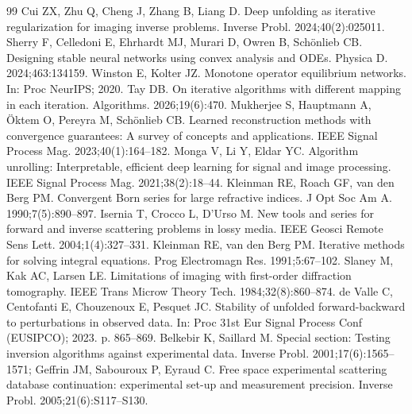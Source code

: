 \documentclass[journal,cmes,article,submit,moreauthors,pdftex]{Definitions/tsp}
\begin{document}
\begin{thebibliography}{99}
Cui ZX, Zhu Q, Cheng J, Zhang B, Liang D. Deep unfolding as iterative regularization for imaging inverse problems. Inverse Probl. 2024;40(2):025011.
Sherry F, Celledoni E, Ehrhardt MJ, Murari D, Owren B, Sch\"onlieb CB. Designing stable neural networks using convex analysis and ODEs. Physica D. 2024;463:134159.
Winston E, Kolter JZ. Monotone operator equilibrium networks. In: Proc NeurIPS; 2020.
Tay DB. On iterative algorithms with different mapping in each iteration. Algorithms. 2026;19(6):470.
Mukherjee S, Hauptmann A, \"Oktem O, Pereyra M, Sch\"onlieb CB. Learned reconstruction methods with convergence guarantees: A survey of concepts and applications. IEEE Signal Process Mag. 2023;40(1):164--182.
Monga V, Li Y, Eldar YC. Algorithm unrolling: Interpretable, efficient deep learning for signal and image processing. IEEE Signal Process Mag. 2021;38(2):18--44.
Kleinman RE, Roach GF, van den Berg PM. Convergent Born series for large refractive indices. J Opt Soc Am A. 1990;7(5):890--897.
Isernia T, Crocco L, D'Urso M. New tools and series for forward and inverse scattering problems in lossy media. IEEE Geosci Remote Sens Lett. 2004;1(4):327--331.
Kleinman RE, van den Berg PM. Iterative methods for solving integral equations. Prog Electromagn Res. 1991;5:67--102.
Slaney M, Kak AC, Larsen LE. Limitations of imaging with first-order diffraction tomography. IEEE Trans Microw Theory Tech. 1984;32(8):860--874.
de Valle C, Centofanti E, Chouzenoux E, Pesquet JC. Stability of unfolded forward-backward to perturbations in observed data. In: Proc 31st Eur Signal Process Conf (EUSIPCO); 2023. p. 865--869.
Belkebir K, Saillard M. Special section: Testing inversion algorithms against experimental data. Inverse Probl. 2001;17(6):1565--1571; Geffrin JM, Sabouroux P, Eyraud C. Free space experimental scattering database continuation: experimental set-up and measurement precision. Inverse Probl. 2005;21(6):S117--S130.
\end{thebibliography}
\end{document}
